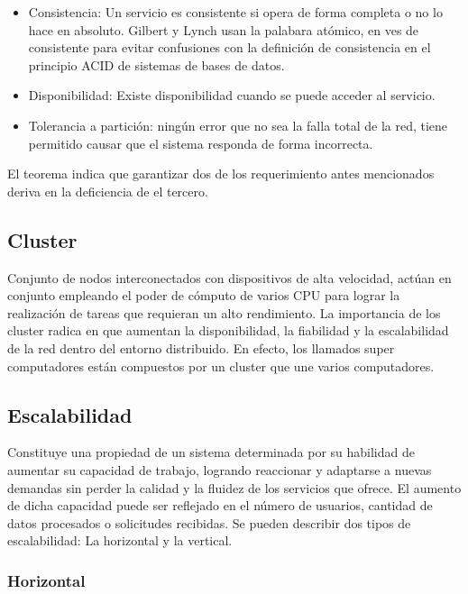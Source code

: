 \begin{itemize}
\item Consistencia:  Un servicio es consistente si opera de forma completa o no lo hace en absoluto. Gilbert y Lynch usan la palabara atómico, en ves de consistente para evitar confusiones con la definición de consistencia en el principio ACID de sistemas de bases de datos.\cite{capt}

\item Disponibilidad: Existe disponibilidad cuando se puede acceder al servicio.\cite{capt}

\item Tolerancia a partición: ningún error que no sea la falla total de la red, tiene permitido causar que el sistema responda de forma incorrecta.\cite{capt}

\end{itemize}
	El teorema indica que garantizar dos de los requerimiento antes mencionados deriva en la deficiencia de el tercero.\cite{capt}


\subsection{Cluster}

Conjunto de nodos interconectados con dispositivos de alta velocidad, actúan en conjunto empleando el poder de cómputo de varios CPU para lograr la realización de tareas que requieran un alto rendimiento. La importancia de los cluster radica en que aumentan la disponibilidad, la fiabilidad y la escalabilidad de la red dentro del entorno distribuido. En efecto, los llamados super computadores están compuestos por un cluster que une varios computadores.\cite{46dd}

\subsection{Escalabilidad}

Constituye una propiedad de un sistema determinada por su habilidad de aumentar su capacidad de trabajo, logrando reaccionar y adaptarse a nuevas demandas sin perder la calidad y la fluidez de los servicios que ofrece. El aumento de dicha capacidad puede ser reflejado en el número de usuarios, cantidad de datos procesados o solicitudes recibidas. Se pueden describir dos tipos de escalabilidad: La horizontal y la vertical.\cite{48dd}

\subsubsection{Horizontal}

